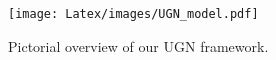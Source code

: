 

\begin{figure}[t]
\centering
\vspace{-.2cm}
\texttt{[image: Latex/images/UGN\_model.pdf]}
\caption{
\small Pictorial overview of our UGN framework.
}
\label{fig:arch}
\end{figure}